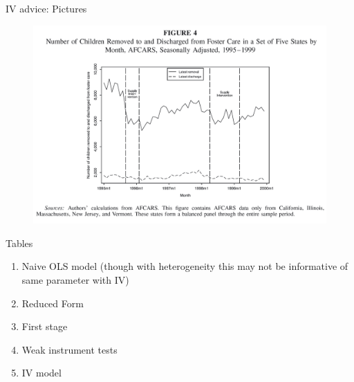 \documentclass{beamer}
\begin{document}
\begin{frame}{IV advice: Pictures}

  \begin{figure}
    \includegraphics[scale=0.15]{./lecture_includes/keith_2.png}
  \end{figure}

\end{frame}

\begin{frame}{Tables}

  \begin{enumerate}
    \item Naive OLS model (though with heterogeneity this may not be informative of same parameter with IV)
    \item Reduced Form
    \item First stage
    \item Weak instrument tests
    \item IV model
  \end{enumerate}

\end{frame}
\end{document}

